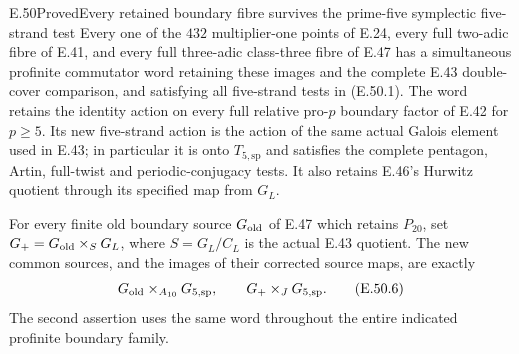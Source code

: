 \begin{statement}{E.50}{Proved}{Every retained boundary fibre survives the prime-five symplectic five-strand test}
Every one of the $432$ multiplier-one points of E.24,
every full two-adic fibre of E.41, and every full
three-adic class-three fibre of E.47 has a simultaneous
profinite commutator word retaining these images and the
complete E.43 double-cover comparison, and satisfying
all five-strand tests in \textup{(E.50.1)}.
The word retains the identity action on every full
relative pro-$p$ boundary factor of E.42 for $p\ge5$.
Its new five-strand action is the action of the same
actual Galois element used in E.43; in particular it is
onto $T_{5,\mathrm{sp}}$ and satisfies the complete
pentagon, Artin, full-twist and periodic-conjugacy tests.
It also retains E.46's Hurwitz quotient through its
specified map from $G_L$.

For every finite old boundary source $G_{\rm old}$ of
E.47 which retains $P_{20}$, set
$G_+=G_{\rm old}\times_S G_L$, where $S=G_L/C_L$
is the actual E.43 quotient.  The new common sources,
and the images of their corrected source maps, are exactly
\[
 G_{\rm old}\times_{A_{10}}G_{5,\mathrm{sp}},
       \qquad
 G_+\times_JG_{5,\mathrm{sp}}.
 \tag{E.50.6}
\]
The second assertion uses the same word throughout the
entire indicated profinite boundary family.
\end{statement}

